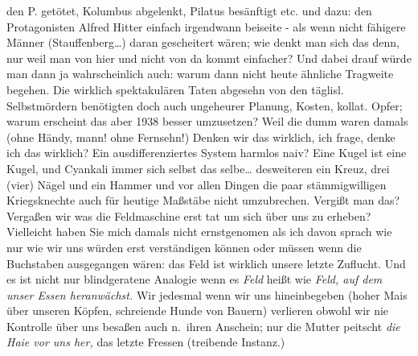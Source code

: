 \documentclass[
]{article}
\begin{document}
den P. getötet, Kolumbus abgelenkt, Pilatus besänftigt etc. und dazu:
den Protagonisten Alfred Hitter einfach irgendwann beiseite - als wenn
nicht fähigere Männer (Stauffenberg\ldots) daran gescheitert wären; wie
denkt man sich das denn, nur weil man von hier und nicht von da kommt
einfacher? Und dabei drauf würde man dann ja wahrscheinlich auch: warum
dann nicht heute ähnliche Tragweite begehen. Die wirklich spektakulären
Taten abgesehn von den täglisl. Selbstmördern benötigten doch auch
ungeheurer Planung, Kosten, kollat. Opfer; warum erscheint das aber 1938
besser umzusetzen? Weil die dumm waren damals (ohne Händy, mann! ohne
Fernsehn!) Denken wir das wirklich, ich frage, denke ich das wirklich?
Ein ausdifferenziertes System harmlos naiv? Eine Kugel ist eine Kugel,
und Cyankali immer sich selbst das selbe\ldots{} desweiteren ein Kreuz,
drei (vier) Nägel und ein Hammer und vor allen Dingen die paar
stämmigwilligen Kriegsknechte auch für heutige Maßstäbe nicht
umzubrechen. Vergißt man das? Vergaßen wir was die Feldmaschine erst tat
um sich über uns zu erheben? Vielleicht haben Sie mich damals nicht
ernstgenomen als ich davon sprach wie nur wie wir uns würden erst
verständigen können oder müssen wenn die Buchstaben ausgegangen wären:
das Feld ist wirklich unsere letzte Zuflucht. Und es ist nicht nur
blindgeratene Analogie wenn es \emph{Feld} heißt wie \emph{Feld, auf dem
unser Essen heranwächst.} Wir jedesmal wenn wir uns hineinbegeben (hoher
Mais über unseren Köpfen, schreiende Hunde von Bauern) verlieren obwohl
wir nie Kontrolle über uns besaßen auch n.~ihren Anschein; nur die
Mutter peitscht \emph{die Haie vor uns her,} das letzte Fressen
(treibende Instanz.)
\end{document}
